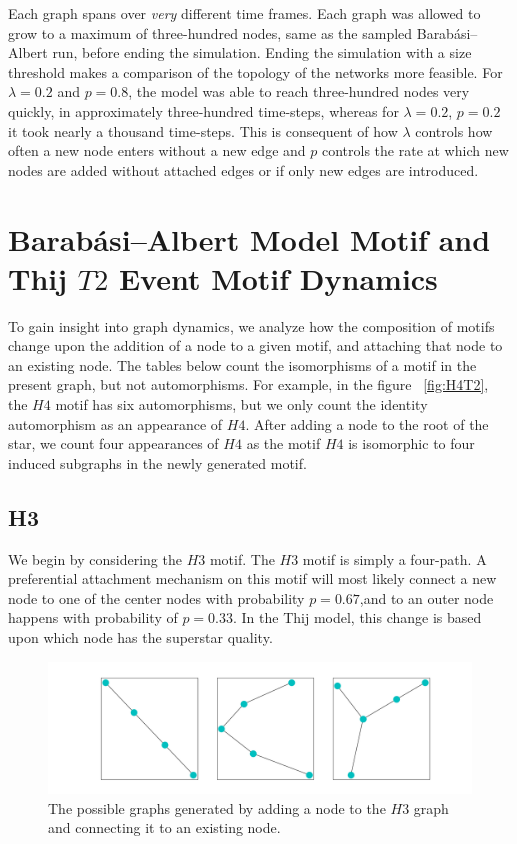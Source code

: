 Each graph spans over \textit{very} different
time frames. Each graph was allowed to grow to a maximum of three-hundred nodes, same as the
sampled Barabási–Albert run, before ending the simulation. Ending the simulation with a size
threshold makes a comparison of the topology of the networks more feasible. For $\lambda=0.2$ and $p=0.8$, the model was able to reach 
three-hundred nodes very quickly, in approximately three-hundred time-steps, whereas for $\lambda=0.2$, $p=0.2$ it took nearly a thousand time-steps. This is consequent of how $\lambda$ controls how often a new node enters without a new edge and
$p$ controls the rate at which new nodes are added without attached edges or if only new edges are introduced. 

\chapter{Barabási–Albert Model Motif and Thij $T2$ Event Motif Dynamics}

To gain insight into graph dynamics, we analyze how the composition of motifs change 
upon the addition of a node to a given motif, and attaching that node to an existing node. 
The tables below count the isomorphisms of a motif in the present graph, but not automorphisms.
For example, in the figure ~\ref{fig:H4T2}, the $H4$ motif has six automorphisms, but we only count the identity automorphism as 
an appearance of $H4$. After adding a node to the root of the star, we count four appearances 
of $H4$ as the motif $H4$ is isomorphic to four induced subgraphs in the newly generated motif. 

\section{H3}
We begin by considering the $H3$ motif. The $H3$ motif is simply a four-path. A preferential attachment
mechanism on this motif will most likely connect a new node to one of the center nodes with probability
$p=0.67$,and to an outer node happens with probability of $p=0.33$. In the Thij model,
this change is based upon which node has the superstar quality. 

\begin{figure}[!ht]
    \includegraphics[width=16cm]{Images/H3_evolution.png}
    \centering
    \caption{The possible graphs generated by adding a node to the $H3$ graph 
    and connecting it to an existing node.}
\end{figure}
\FloatBarrier

